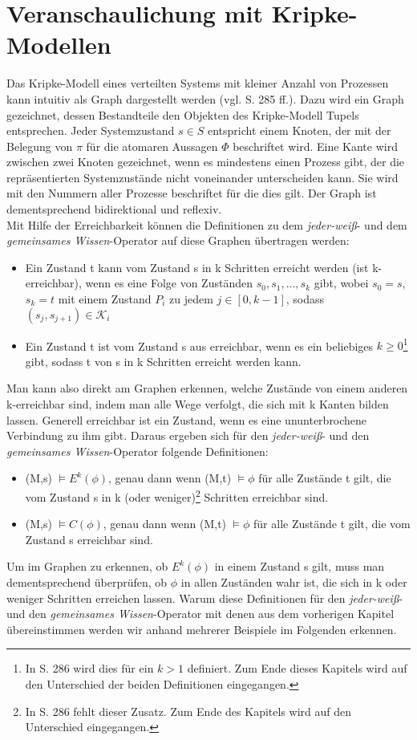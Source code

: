 \section{Veranschaulichung mit Kripke-Modellen}
\label{Kripke-Modelle}
Das Kripke-Modell eines verteilten Systems mit kleiner Anzahl von Prozessen kann intuitiv als Graph dargestellt werden (vgl. \cite{kshemkalyani2011distributed} S. 285 ff.).
Dazu wird ein Graph gezeichnet, dessen Bestandteile den Objekten des Kripke-Modell Tupels entsprechen.
Jeder Systemzustand $s\in S$ entspricht einem Knoten, der mit der Belegung von $\pi$ für die atomaren Aussagen $\Phi$ beschriftet wird. Eine Kante wird zwischen zwei Knoten gezeichnet, wenn es mindestens einen Prozess gibt, der die repräsentierten Systemzustände nicht voneinander unterscheiden kann. Sie wird mit den Nummern aller Prozesse beschriftet für die dies gilt.
Der Graph ist dementsprechend bidirektional und reflexiv.\\
Mit Hilfe der Erreichbarkeit können die Definitionen zu dem \textit{jeder-weiß}- und dem \textit{gemeinsames Wissen}-Operator auf diese Graphen übertragen werden:
\begin{itemize}
	\item Ein Zustand t kann vom Zustand s in k Schritten erreicht werden (ist k-erreichbar), wenn es eine Folge von Zuständen $s_0,s_1,...,s_k$ gibt, wobei $s_0 = s$, $s_k = t$ mit einem Zustand $P_i$ zu jedem $j\in [ 0,k-1 ]$, sodass $(s_j,s_{j+1})\in \mathcal{K}_i$
	\item Ein Zustand t ist vom Zustand s aus erreichbar, wenn es ein beliebiges $k \ge 0$\footnote{\label{note1}In \cite{kshemkalyani2011distributed} S. 286 wird dies für ein $k > 1$ definiert. Zum Ende dieses Kapitels wird auf den Unterschied der beiden Definitionen eingegangen.} gibt, sodass t von s in k Schritten erreicht werden kann.
\end{itemize}
Man kann also direkt am Graphen erkennen, welche Zustände von einem anderen k-erreichbar sind, indem man alle Wege verfolgt, die sich mit k Kanten bilden lassen.
Generell erreichbar ist ein Zustand, wenn es eine ununterbrochene Verbindung zu ihm gibt.
Daraus ergeben sich für den \textit{jeder-weiß}- und den \textit{gemeinsames Wissen}-Operator folgende Definitionen:
\begin{itemize}
	\item (M,s) $\vDash E^{k}(\phi)$, genau dann wenn (M,t) $\vDash \phi$ für alle Zustände t gilt, die vom Zustand s in k (oder weniger)\footnote{\label{note2}In \cite{kshemkalyani2011distributed} S. 286 fehlt dieser Zusatz. Zum Ende des Kapitels wird auf den Unterschied eingegangen.} Schritten erreichbar sind.
	\item (M,s) $\vDash C(\phi)$, genau dann wenn (M,t) $\vDash \phi$ für alle Zustände t gilt, die vom Zustand s erreichbar sind.
\end{itemize}
Um im Graphen zu erkennen, ob $E^{k}(\phi)$ in einem Zustand s gilt, muss man dementsprechend überprüfen, ob $\phi$ in allen Zuständen wahr ist, die sich in k oder weniger Schritten erreichen lassen. 
Warum diese Definitionen für den \textit{jeder-weiß}- und den \textit{gemeinsames Wissen}-Operator mit denen aus dem vorherigen Kapitel übereinstimmen werden wir anhand mehrerer Beispiele im Folgenden erkennen.

